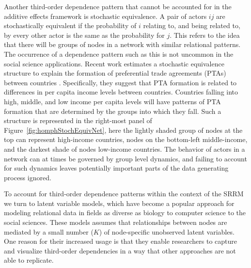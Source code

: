 \documentclass[12pt,pdflatex]{elsarticle}
\begin{document}
Another third-order dependence pattern that cannot be accounted for in the additive effects framework is stochastic equivalence. A pair of actors $ij$ are stochastically equivalent if the probability of $i$ relating to, and being related to, by every other actor is the same as the probability for $j$. This refers to the idea that there will be groups of nodes in a network with similar relational patterns. The occurrence of a dependence pattern such as this is not uncommon in the social science applications. Recent work estimates a stochastic equivalence structure to explain the formation of preferential trade agreements (PTAs) between countries \cite{manger:etal:2012}. Specifically, they suggest that PTA formation is related to differences in per capita income levels between countries. Countries falling into high, middle, and low income per capita levels will have patterns of PTA formation that are determined by the groups into which they fall. Such a structure is represented in the right-most panel of Figure~\ref{fig:homphStochEquivNet}, here the lightly shaded group of nodes at the top can represent high-income countries, nodes on the bottom-left middle-income, and the darkest shade of nodes low-income countries. The behavior of actors in a network can at times be governed by group level dynamics, and failing to account for such dynamics leaves potentially important parts of the data generating process ignored.

To account for third-order dependence patterns within the context of the SRRM we turn to latent variable models, which have become a popular approach for modeling relational data in fields as diverse as biology to computer science to the social sciences. These models assumes that relationships between nodes are mediated by a small number ($K$) of node-specific unobserved latent variables. One reason for their increased usage is that they enable researchers to capture and visualize third-order dependencies in a way that other approaches are not able to replicate. %
\end{document}
